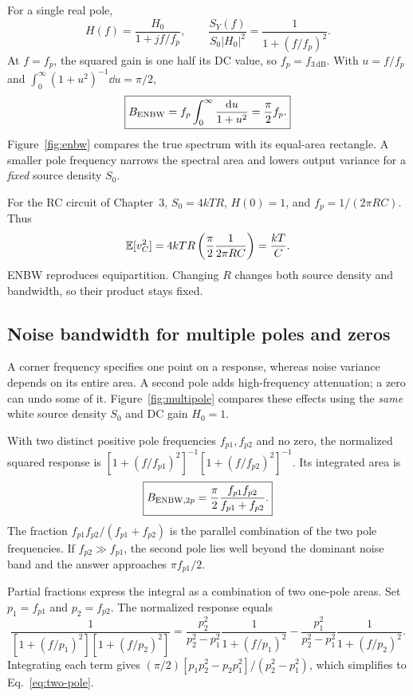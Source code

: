 For a single real pole,
\[
H(f)=\frac{H_0}{1+jf/f_p},\qquad
\frac{S_Y(f)}{S_0|H_0|^2}=\frac{1}{1+(f/f_p)^2}.
\]
At $f=f_p$, the squared gain is one half its DC value, so $f_p=f_{3\,\mathrm{dB}}$. With $u=f/f_p$ and $\int_0^\infty(1+u^2)^{-1}\dd u=\pi/2$,
\begin{equation}
\boxed{B_{\mathrm{ENBW}}=f_p\int_0^\infty\frac{\mathrm d u}{1+u^2}
=\frac{\pi}{2}f_p.}\label{eq:enbw-onepole}
\end{equation}
Figure~\ref{fig:enbw} compares the true spectrum with its equal-area rectangle. A smaller pole frequency narrows the spectral area and lowers output variance for a \emph{fixed} source density $S_0$.
\NoiseBandwidthFigure

\begin{example}[title={Equivalent noise bandwidth of an RC circuit}]
For the RC circuit of Chapter~3, $S_0=4kTR$, $H(0)=1$, and $f_p=1/(2\pi RC)$. Thus
\[
\mathbb E[v_C^2]=4kTR\left(\frac\pi2\frac1{2\pi RC}\right)=\frac{kT}{C}.
\]
ENBW reproduces equipartition. Changing $R$ changes both source density and bandwidth, so their product stays fixed.
\end{example}

\subsection{Noise bandwidth for multiple poles and zeros}
A corner frequency specifies one point on a response, whereas noise variance depends on its entire area. A second pole adds high-frequency attenuation; a zero can undo some of it. Figure~\ref{fig:multipole} compares these effects using the \emph{same} white source density $S_0$ and DC gain $H_0=1$.
\MultiPoleFigure

With two distinct positive pole frequencies $f_{p1},f_{p2}$ and no zero, the normalized squared response is $[1+(f/f_{p1})^2]^{-1}[1+(f/f_{p2})^2]^{-1}$. Its integrated area is
\begin{equation}
\boxed{B_{\mathrm{ENBW},2p}=\frac{\pi}{2}\frac{f_{p1}f_{p2}}{f_{p1}+f_{p2}}.}\label{eq:two-pole}
\end{equation}
The fraction $f_{p1}f_{p2}/(f_{p1}+f_{p2})$ is the parallel combination of the two pole frequencies. If $f_{p2}\gg f_{p1}$, the second pole lies well beyond the dominant noise band and the answer approaches $\pi f_{p1}/2$.

Partial fractions express the integral as a combination of two one-pole areas. Set $p_1=f_{p1}$ and $p_2=f_{p2}$. The normalized response equals
\[
\frac{1}{[1+(f/p_1)^2][1+(f/p_2)^2]}
=\frac{p_2^2}{p_2^2-p_1^2}\frac{1}{1+(f/p_1)^2}
-\frac{p_1^2}{p_2^2-p_1^2}\frac{1}{1+(f/p_2)^2}.
\]
Integrating each term gives $(\pi/2)[p_1p_2^2-p_2p_1^2]/(p_2^2-p_1^2)$, which simplifies to Eq.~\eqref{eq:two-pole}. 

